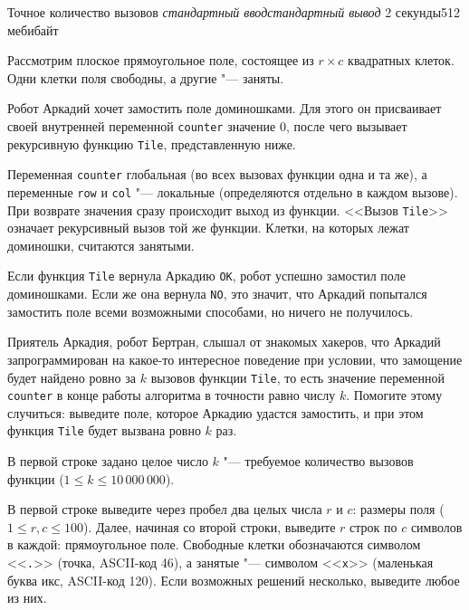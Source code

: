 \gdef\thisproblemorigin{190421, LIII чемпионат СПбГУ}
\gdef\thisproblemauthor{Иван Казменко}
\gdef\thisproblemdeveloper{Иван Казменко}
\begin{problem}{Точное количество вызовов}
{\textsl{стандартный ввод}}{\textsl{стандартный вывод}}
{2 секунды}{512 мебибайт}{}

Рассмотрим плоское прямоугольное поле,
состоящее из $r \times c$ квадратных клеток.
Одни клетки поля свободны, а другие "--- заняты.

Робот Аркадий хочет замостить поле доминошками.
Для этого он присваивает своей внутренней переменной \texttt{counter}
значение $0$, после чего вызывает рекурсивную функцию \texttt{Tile},
представленную ниже.



Переменная \texttt{counter} глобальная
(во всех вызовах функции одна и та же),
а переменные \texttt{row} и \texttt{col} "--- локальные
(определяются отдельно в каждом вызове).
При возврате значения сразу происходит выход из функции.
<<Вызов \texttt{Tile}>> означает рекурсивный вызов той же функции.
Клетки, на которых лежат доминошки, считаются занятыми.

Если функция \texttt{Tile} вернула Аркадию \texttt{OK},
робот успешно замостил поле доминошками.
Если же она вернула \texttt{NO}, это значит, что Аркадий
попытался замостить поле всеми возможными способами, но ничего не получилось.

Приятель Аркадия, робот Бертран, слышал от знакомых хакеров,
что Аркадий запрограммирован на какое-то интересное поведение
при условии, что замощение будет найдено ровно за $k$ вызовов
функции \texttt{Tile}, то есть значение переменной \texttt{counter}
в конце работы алгоритма в точности равно числу $k$.
Помогите этому случиться: выведите поле, которое Аркадию удастся замостить,
и при этом функция \texttt{Tile} будет вызвана ровно $k$ раз.

\InputFile

В первой строке задано целое число $k$ "---
требуемое количество вызовов функции
($1 \le k \le 10\,000\,000$).

\OutputFile

В первой строке выведите через пробел два целых числа $r$ и $c$:
размеры поля
($1 \le r, c \le 100$).
Далее, начиная со второй строки, выведите $r$ строк по $c$ символов в каждой:
прямоугольное поле.
Свободные клетки обозначаются символом <<\texttt{.}>> (точка, ASCII-код 46),
а занятые "--- символом <<\texttt{x}>> (маленькая буква икс, ASCII-код 120).
Если возможных решений несколько, выведите любое из них.

\Examples

\begin{example}
\exmp{%
%
}{%
%
}%
\exmp{%
%
}{%
%
}%
\end{example}

\end{problem}
